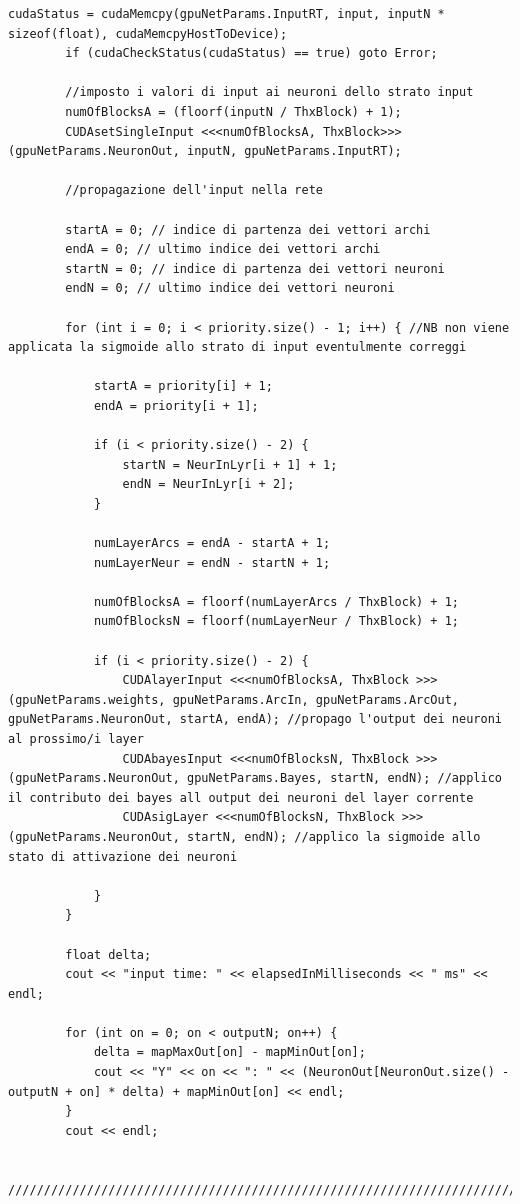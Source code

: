 \documentclass[10pt,a4paper]{article}
\begin{document}
\begin{lstlisting}[style=mycuda, caption= classe di interfaccia alla GPU, captionpos=b]
		cudaStatus = cudaMemcpy(gpuNetParams.InputRT, input, inputN * sizeof(float), cudaMemcpyHostToDevice);
		if (cudaCheckStatus(cudaStatus) == true) goto Error;

		//imposto i valori di input ai neuroni dello strato input
		numOfBlocksA = (floorf(inputN / ThxBlock) + 1);
		CUDAsetSingleInput <<<numOfBlocksA, ThxBlock>>> (gpuNetParams.NeuronOut, inputN, gpuNetParams.InputRT);
		
		//propagazione dell'input nella rete

		startA = 0; // indice di partenza dei vettori archi
		endA = 0; // ultimo indice dei vettori archi
		startN = 0; // indice di partenza dei vettori neuroni
		endN = 0; // ultimo indice dei vettori neuroni

		for (int i = 0; i < priority.size() - 1; i++) { //NB non viene applicata la sigmoide allo strato di input eventulmente correggi

			startA = priority[i] + 1;
			endA = priority[i + 1];

			if (i < priority.size() - 2) {
				startN = NeurInLyr[i + 1] + 1;
				endN = NeurInLyr[i + 2];
			}

			numLayerArcs = endA - startA + 1;
			numLayerNeur = endN - startN + 1;

			numOfBlocksA = floorf(numLayerArcs / ThxBlock) + 1;
			numOfBlocksN = floorf(numLayerNeur / ThxBlock) + 1;

			if (i < priority.size() - 2) {
				CUDAlayerInput <<<numOfBlocksA, ThxBlock >>> (gpuNetParams.weights, gpuNetParams.ArcIn, gpuNetParams.ArcOut, gpuNetParams.NeuronOut, startA, endA); //propago l'output dei neuroni al prossimo/i layer
				CUDAbayesInput <<<numOfBlocksN, ThxBlock >>> (gpuNetParams.NeuronOut, gpuNetParams.Bayes, startN, endN); //applico il contributo dei bayes all output dei neuroni del layer corrente 
				CUDAsigLayer <<<numOfBlocksN, ThxBlock >>> (gpuNetParams.NeuronOut, startN, endN); //applico la sigmoide allo stato di attivazione dei neuroni
				
			}
		}

		float delta;
		cout << "input time: " << elapsedInMilliseconds << " ms" << endl;

		for (int on = 0; on < outputN; on++) {
			delta = mapMaxOut[on] - mapMinOut[on];
			cout << "Y" << on << ": " << (NeuronOut[NeuronOut.size() - outputN + on] * delta) + mapMinOut[on] << endl;
		}
		cout << endl;
		
		//////////////////////////////////////////////////////////////////////////////////////


\end{lstlisting}
\end{document}
